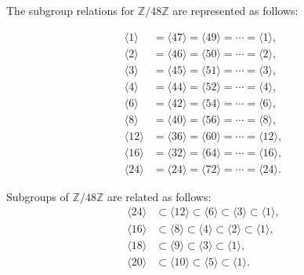 \documentclass[11pt,a4paper]{article}
\begin{document}
The subgroup relations for \( \mathbb{Z}/48\mathbb{Z} \) are represented as follows:

\begin{align*}
    \langle 1 \rangle & = \langle 47 \rangle = \langle 49 \rangle = \cdots = \langle 1 \rangle, \\
    \langle 2 \rangle & = \langle 46 \rangle = \langle 50 \rangle = \cdots = \langle 2 \rangle, \\
    \langle 3 \rangle & = \langle 45 \rangle = \langle 51 \rangle = \cdots = \langle 3 \rangle, \\
    \langle 4 \rangle & = \langle 44 \rangle = \langle 52 \rangle = \cdots = \langle 4 \rangle, \\
    \langle 6 \rangle & = \langle 42 \rangle = \langle 54 \rangle = \cdots = \langle 6 \rangle, \\
    \langle 8 \rangle & = \langle 40 \rangle = \langle 56 \rangle = \cdots = \langle 8 \rangle, \\
    \langle 12 \rangle & = \langle 36 \rangle = \langle 60 \rangle = \cdots = \langle 12 \rangle, \\
    \langle 16 \rangle & = \langle 32 \rangle = \langle 64 \rangle = \cdots = \langle 16 \rangle, \\
    \langle 24 \rangle & = \langle 24 \rangle = \langle 72 \rangle = \cdots = \langle 24 \rangle.
\end{align*}

Subgroups of \( \mathbb{Z}/48\mathbb{Z} \) are related as follows:
\begin{align*}
    \langle 24 \rangle & \subset \langle 12 \rangle \subset \langle 6 \rangle \subset \langle 3 \rangle \subset \langle 1 \rangle, \\
    \langle 16 \rangle & \subset \langle 8 \rangle \subset \langle 4 \rangle \subset \langle 2 \rangle \subset \langle 1 \rangle, \\
    \langle 18 \rangle & \subset \langle 9 \rangle \subset \langle 3 \rangle \subset \langle 1 \rangle, \\
    \langle 20 \rangle & \subset \langle 10 \rangle \subset \langle 5 \rangle \subset \langle 1 \rangle.
\end{align*}
\end{document}
